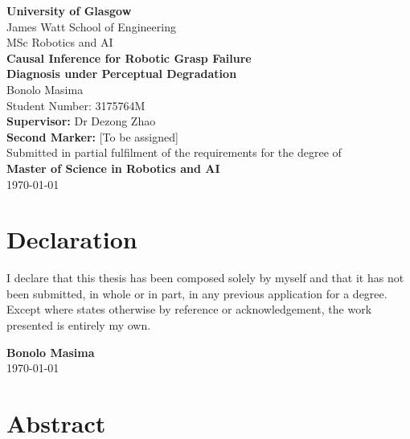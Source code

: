 \documentclass[11pt,a4paper]{report}
\begin{document}
\begin{titlepage}
  \centering
  \vspace*{1cm}

  {\Large\textbf{University of Glasgow}}\\[0.3cm]
  {\large James Watt School of Engineering}\\[0.3cm]
  {\large MSc Robotics and AI}\\[2cm]

  {\LARGE\textbf{Causal Inference for Robotic Grasp Failure\\
  Diagnosis under Perceptual Degradation}}\\[2cm]

  {\Large Bonolo Masima}\\[0.3cm]
  {\large Student Number: 3175764M}\\[2cm]

  \textbf{Supervisor:} Dr Dezong Zhao\\[0.5cm]
  \textbf{Second Marker:} [To be assigned]\\[2cm]

  Submitted in partial fulfilment of the requirements for the degree of\\
  \textbf{Master of Science in Robotics and AI}\\[1cm]

  \vfill
  {\large \today}
\end{titlepage}

\chapter*{Declaration}

I declare that this thesis has been composed solely by myself and that it has not been submitted, in whole or in part, in any previous application for a degree. Except where states otherwise by reference or acknowledgement, the work presented is entirely my own.

\vspace{2cm}
\noindent
\textbf{Bonolo Masima}\\
\today

\chapter*{Abstract}
\end{document}
